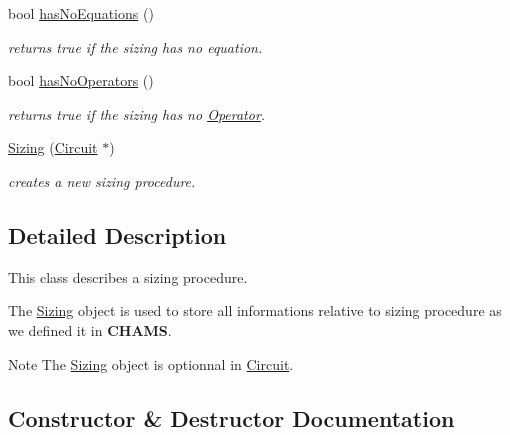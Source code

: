\begin{DoxyCompactItemize}
\mbox{\label{class_open_chams_1_1_sizing_a1b6ba7a6c0883f65fa26ad46691946cb}} 
bool \hyperlink{class_open_chams_1_1_sizing_a1b6ba7a6c0883f65fa26ad46691946cb}{has\+No\+Equations} ()
\begin{DoxyCompactList}\small\item\em returns true if the sizing has no equation. \end{DoxyCompactList}\item 
\mbox{\label{class_open_chams_1_1_sizing_ac8a299add4fd32ff8bf99c889f4a79a6}} 
bool \hyperlink{class_open_chams_1_1_sizing_ac8a299add4fd32ff8bf99c889f4a79a6}{has\+No\+Operators} ()
\begin{DoxyCompactList}\small\item\em returns true if the sizing has no \hyperlink{class_open_chams_1_1_operator}{Operator}. \end{DoxyCompactList}\item 
\hyperlink{class_open_chams_1_1_sizing_aa1e5f28af7b674134fda04ce64bf1004}{Sizing} (\hyperlink{class_open_chams_1_1_circuit}{Circuit} $\ast$)
\begin{DoxyCompactList}\small\item\em creates a new sizing procedure. \end{DoxyCompactList}\end{DoxyCompactItemize}


\subsection{Detailed Description}
This class describes a sizing procedure.

The \hyperlink{class_open_chams_1_1_sizing}{Sizing} object is used to store all informations relative to sizing procedure as we defined it in {\bfseries C\+H\+A\+MS}.

\begin{DoxyNote}{Note}
The \hyperlink{class_open_chams_1_1_sizing}{Sizing} object is optionnal in \hyperlink{class_open_chams_1_1_circuit}{Circuit}. 
\end{DoxyNote}


\subsection{Constructor \& Destructor Documentation}
\mbox{\label{class_open_chams_1_1_sizing_aa1e5f28af7b674134fda04ce64bf1004}} 
